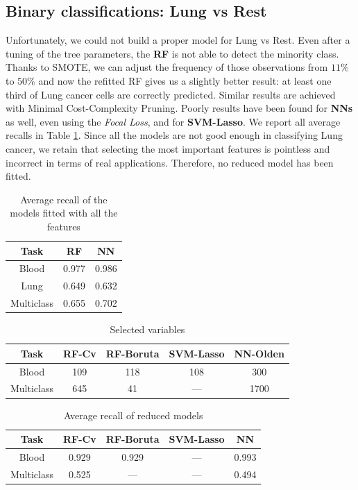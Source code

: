 \documentclass[a4paper,11pt, oneside]{article}  %
\begin{document}
\subsection{Binary classifications: Lung vs Rest}
Unfortunately,  we could not build a proper model for Lung vs Rest.  Even after a tuning of the tree parameters,  the \textbf{RF} is not able to detect the minority class.  Thanks to SMOTE, we can adjust the frequency of those observations from $11\%$ to $50\%$ and now the refitted RF gives us a slightly better result: at least one third of Lung cancer cells are correctly predicted.  Similar results are achieved with Minimal Cost-Complexity Pruning. Poorly results have been found for \textbf{NNs} as well,  even using the \textit{Focal Loss}, and for \textbf{SVM-Lasso}. We report all average recalls in Table \ref{table:big_models}.  Since all the models are not good enough in classifying Lung cancer, we retain that selecting the most important features is pointless and incorrect in terms of real applications. Therefore, no reduced model has been fitted.



\begin{table}[h!]
	\caption{Average recall of the models fitted with all the features}
	\centering
	\begin{tabular}{c c c}
		\hline\hline
		Task & RF & NN \\ [0.5ex] %
		\hline
		Blood & 0.977  & 0.986 \\
		Lung & 0.649  & 0.632 \\
		Multiclass & 0.655 & 0.702 \\ [1ex]
		\hline
	\end{tabular}
	\label{table:big_models}
\end{table}

\begin{table}[h!]
	\caption{Selected variables}
	\centering
	\begin{tabular}{c c c c c}
		\hline\hline
		Task & RF-Cv &  RF-Boruta & SVM-Lasso & NN-Olden \\ [0.5ex] %
		\hline
		Blood & 109 & 118 & 108 & 300 \\
		Multiclass & 645 &  41 & --- & 1700 \\ [1ex]
		\hline
	\end{tabular}
	\label{table:selected variables}
\end{table}

\begin{table}[h!]
	\caption{Average recall of reduced models}
	\centering
	\begin{tabular}{c c c c c}
		\hline\hline
		Task & RF-Cv & RF-Boruta & SVM-Lasso & NN \\ [0.5ex] %
		\hline
		Blood & 0.929 & 0.929 & --- & 0.993 \\
		Multiclass & 0.525 & --- &  --- & 0.494 \\ [1ex]
		\hline
	\end{tabular}
	\label{table:reduced_models}
\end{table}
\end{document}
